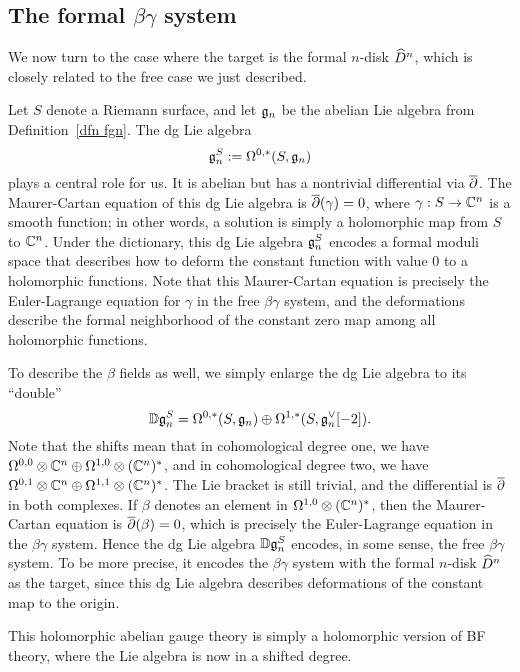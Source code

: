 \subsection{The formal $\beta\gamma$ system}

We now turn to the case where the target is the formal $n$-disk $\widehat{D}^n$,
which is closely related to the free case we just described.

Let $S$ denote a Riemann surface, and let $\mathfrak g_n$ be the abelian Lie algebra from Definition~\ref{dfn fgn}. 
The dg Lie algebra $$\mathfrak g_n^S := \Omega^{0,*}(S,\mathfrak g_n)$$ plays a central role for us.
It is abelian but has a nontrivial differential via $\overline{\partial}$.
The Maurer-Cartan equation of this dg Lie algebra is $\overline{\partial}(\gamma) = 0$, where $\gamma: S \to \mathbb C^n$ is a smooth function;
in other words, a solution is simply a holomorphic map from $S$ to $\mathbb C^n$.
Under the dictionary, this dg Lie algebra $\mathfrak g^S_n$ encodes a formal moduli space that describes how to deform the constant function with value $0$ to a holomorphic functions.
Note that this Maurer-Cartan equation is precisely the Euler-Lagrange equation for $\gamma$ in the free $\beta\gamma$ system,
and the deformations describe the formal neighborhood of the constant zero map among all holomorphic functions.

To describe the $\beta$ fields as well, we simply enlarge the dg Lie algebra to its ``double''
\[
\mathbb D \mathfrak g_n^S = \Omega^{0,*}(S, \mathfrak g_n) \oplus \Omega^{1,*}(S, \mathfrak g_n^\vee[-2]).
\]
Note that the shifts mean that in cohomological degree one, we have $\Omega^{0,0} \otimes \mathbb C^n \oplus \Omega^{1,0} \otimes (\mathbb C^n)^*$, 
and in cohomological degree two, we have $\Omega^{0,1} \otimes \mathbb C^n \oplus \Omega^{1,1} \otimes (\mathbb C^n)^*$.
The Lie bracket is still trivial, and the differential is $\overline{\partial}$ in both complexes. 
If $\beta$ denotes an element in $\Omega^{1,0} \otimes (\mathbb C^n)^*$,
then the Maurer-Cartan equation is $\overline{\partial}(\beta) = 0$, which is precisely the Euler-Lagrange equation in the $\beta\gamma$ system.
Hence the dg Lie algebra $\mathbb D \mathfrak g_n^S$ encodes, in some sense, the free $\beta\gamma$ system.
To be more precise, it encodes the $\beta\gamma$ system with the formal $n$-disk $\widehat{D}^n$ as the target,
since this dg Lie algebra describes deformations of the constant map to the origin.

\begin{rmk}
This holomorphic abelian gauge theory is simply a holomorphic version of BF theory, where the Lie algebra is now in a shifted degree.
\end{rmk}

